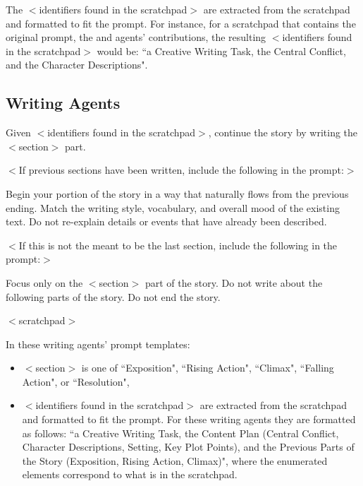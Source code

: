 \documentclass{article}
\begin{document}
The $<$identifiers found in the scratchpad$>$ are extracted from the scratchpad and formatted to fit the prompt. For instance, for a scratchpad that contains the original prompt, the {\sc [conflict]} and {\sc [character]} agents' contributions, the resulting $<$identifiers found in the scratchpad$>$ would be: “a Creative Writing Task, the Central Conflict, and the Character Descriptions".

\subsection{Writing Agents}

\begin{tcolorbox}[colback=white, colframe=my-red, coltitle=black, parskip=5mm, title=
\textbf{\textsc{[$<$Section$>$]} Agent Prompt}, breakable, halign=flush left]
Given 
$<$identifiers found in the scratchpad$>$,
continue the story by writing the $<$section$>$ part.
\medskip

$<$If previous sections have been written, include the following in the prompt:$>$

\medskip
Begin your portion of the story in a way that naturally flows from the previous ending. Match the writing style, vocabulary, and overall mood of the existing text. Do not re-explain details or events that have already been described.
\medskip 

$<$If this is not the meant to be the last section, include the following in the prompt:$>$

\medskip
Focus only on the $<$section$>$ part of the story. Do not write about the following parts of the story. Do not end the story.

\medskip
$<$scratchpad$>$
\end{tcolorbox}

In these writing agents' prompt templates:

\begin{itemize}
    \item $<$section$>$ is one of “Exposition", “Rising Action", “Climax", “Falling Action", or “Resolution", 
    \item $<$identifiers found in the scratchpad$>$ are extracted from the scratchpad and formatted to fit the prompt. For these writing agents they are formatted as follows: 
“a Creative Writing Task, the Content Plan (Central Conflict, Character Descriptions,  Setting, Key Plot Points), and the Previous Parts of the Story (Exposition, Rising Action, Climax)", where the enumerated elements correspond to what is in the scratchpad.
\end{itemize} 
\end{document}
